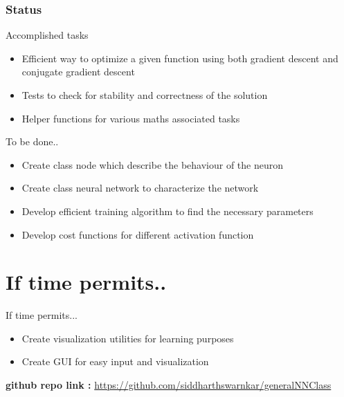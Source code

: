 \documentclass[10pt]{beamer}
\begin{document}
\begin{frame}
\frametitle{Status}
\begin{block}{Accomplished tasks}
\begin{itemize}
\item{Efficient way to optimize a given function using both
gradient descent and conjugate gradient descent}
\item{Tests to check for stability and correctness of the solution}
\item{Helper functions for various maths associated tasks}
\end{itemize}
\end{block}

\begin{alertblock}{To be done..}
\begin{itemize}
\item{Create class node which describe the behaviour of the neuron}
\item{Create class neural network to characterize the network}
\item{Develop efficient training algorithm to find the necessary parameters}
\item{Develop cost functions for different activation function}
\end{itemize}
\end{alertblock}
\end{frame}

\section{If time permits..}
\begin{frame}
If time permits...
\begin{itemize}
\item{Create visualization utilities for learning purposes}
\item{Create GUI for easy input and visualization}
\end{itemize}
\vspace{5cm}
\textbf{github repo link :} 
\url{https://github.com/siddharthswarnkar/generalNNClass}

\end{frame} 
\end{document}
